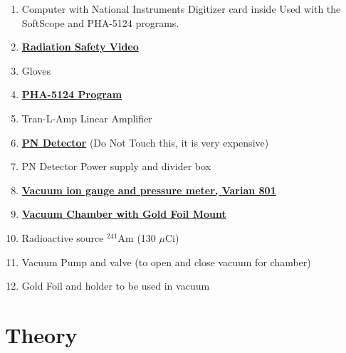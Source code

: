 \documentclass{../lab}
\begin{document}
\begin{enumerate}
    \item Computer with National Instruments Digitizer card inside Used with the SoftScope and PHA-5124 programs.

    \item \href{http://experimentationlab.berkeley.edu/RadiationSafety}{\textbf{Radiation Safety Video}}

    \item Gloves

    \item \href{http://experimentationlab.berkeley.edu/PHA-5124Program}{\textbf{PHA-5124 Program}}

    \item Tran-L-Amp Linear Amplifier

    \item \href{http://physics111.lib.berkeley.edu/Physics111/Reprints/RUT/RUT\_Detector\_018.JPG}{\textbf{PN Detector}} (Do Not Touch this, it is very expensive)

    \item PN Detector Power supply and divider box

    \item \href{http://physics111.lib.berkeley.edu/Physics111/Reprints/RUT/Thermo\_Couple\_ionGauge.pdf}{\textbf{Vacuum ion gauge and pressure meter, Varian 801}}

    \item \href{http://physics111.lib.berkeley.edu/Physics111/Reprints/RUT/RUT\_Chamber\_017.JPG}{\textbf{Vacuum Chamber with Gold Foil Mount}}

    \item Radioactive source $^{241}$Am (130 $\mu$Ci)

    \item Vacuum Pump and valve (to open and close vacuum for chamber)

    \item Gold Foil and holder to be used in vacuum

\end{enumerate}

\newpage

\section{Theory}
\end{document}
